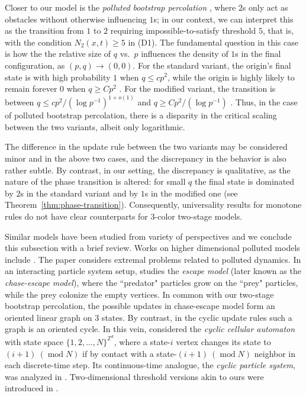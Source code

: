 \documentclass{article}
\newcommand{\bZ}{{\mathbb Z}}
\numberwithin{equation}{section}
\begin{document}
Closer to our model is the {\it polluted 
bootstrap percolation\/} \cite{GravnerMcDonald}, where $2$s 
only act as obstacles without otherwise influencing $1$s; in our context, 
we can interpret 
this as the transition from $1$ to $2$ requiring impossible-to-satisfy threshold $5$, that is, with the condition $N_2(x,t)\ge 5$ in (D1). The fundamental 
question in this case is 
how the 
the relative size of $q$ vs.~$p$ 
influences the density of $1$s in the final configuration, 
as $(p,q)\to(0, 0)$. For the standard variant, the origin's final state is with high probability 
$1$ when 
$q\le cp^2$, while the origin is highly likely to remain forever $0$ when $q\ge Cp^2$ \cite{GravnerMcDonald}.
For 
the modified variant, the transition is between $q\le cp^2/(\log p^{-1})^{1+o(1)}$ and $q\ge Cp^2/(\log p^{-1})$ \cite{GHLS2025}. Thus, 
in the case of polluted bootstrap percolation, there is a disparity in the critical scaling 
between the two variants, albeit only logarithmic.

The difference in the update rule between 
the two variants may be considered minor and in the above two cases, and the discrepancy in the behavior is also rather subtle. 
By contrast, in our setting, 
the discrepancy is qualitative, as the nature of the 
phase transition is altered: for small $q$ the 
final state is dominated by $2$s in the standard variant and by $1$s in the 
modified one (see Theorem~\ref{thm:phase-transition}). Consequently, 
universality results for monotone rules \cite{Bollobs2022, BBMS22, Ghosh} do not have clear counterparts for $3$-color two-stage models. 

Similar models have been studied from variety of perspectives and 
we conclude this subsection with a brief review. Works on higher dimensional  
polluted models include \cite{GravnerHolroyd, GravnerHolroydSivakoff, Ding}. The paper  \cite{BresarHedzetHenning} considers extremal 
problems related to polluted dynamics. 
In an interacting particle system setup, \cite{Kordzakhia} 
studies the \textit{escape model} (later known as the \textit{chase-escape model}), where the ``predator" particles grow on the ``prey" particles, while the prey colonize the empty vertices. In common with our two-stage 
bootstrap percolation, the possible updates in
chase-escape model form an oriented linear graph on $3$ states. By contrast, in the cyclic update rules such a graph is an oriented cycle.
In this vein, \cite{Fisch} considered the \textit{cyclic cellular automaton} with state space $\{1,2,\dots, N\}^{\bZ^d}$, where a state-$i$ vertex changes its state to $(i + 1 )\ (\operatorname{mod} N)$ if by contact with a state-$(i+1) \ (\operatorname{mod} N)$ neighbor in each discrete-time step. Its continuous-time analogue, the \textit{cyclic particle system}, was analyzed in \cite{BramsonGriffeath2}. Two-dimensional threshold versions akin to ours were introduced in \cite{Fisch1991}.
\end{document}
